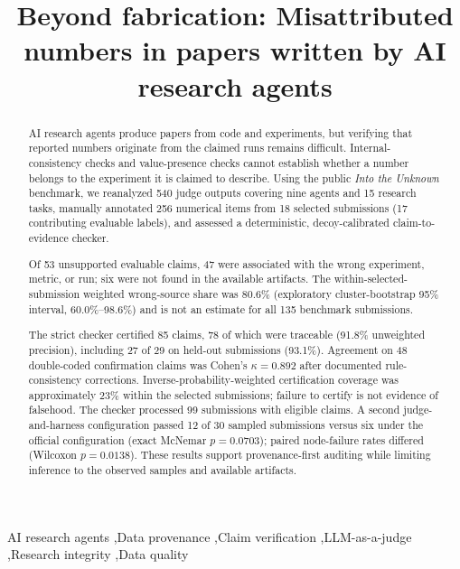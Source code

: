 \documentclass[preprint,12pt,authoryear]{elsarticle}
\newif\ifanon \anontrue
\begin{document}
\begin{frontmatter}
\title{Beyond fabrication: Misattributed numbers in papers written by AI research agents}

\ifanon
\else
\author[aau]{Mosab Alfaqeeh\corref{cor1}}
\ead{m.alfaqeeh@ammanu.edu.jo}
\author[aau]{Omar Mohammed Horani}
\ead{o.horani@ammanu.edu.jo}
\author[aau]{Mou'th Hourani}
\ead{mhourani@ammanu.edu.jo}
\author[bing]{Hashem Alfaqeeh}
\ead{halfageh@binghamton.edu}
\cortext[cor1]{Corresponding author.}
\affiliation[aau]{organization={Al-Ahliyya Amman University},
            city={Amman},
            country={Jordan}}
\affiliation[bing]{organization={Binghamton University, State University of New York},
            city={Binghamton},
            state={NY},
            country={USA}}
\fi

\begin{abstract}
AI research agents produce papers from code and experiments, but verifying that reported numbers originate from the claimed runs remains difficult. Internal-consistency checks and value-presence checks cannot establish whether a number belongs to the experiment it is claimed to describe. Using the public \emph{Into the Unknown} benchmark, we reanalyzed 540 judge outputs covering nine agents and 15 research tasks, manually annotated 256 numerical items from 18 selected submissions (17 contributing evaluable labels), and assessed a deterministic, decoy-calibrated claim-to-evidence checker.

Of 53 unsupported evaluable claims, 47 were associated with the wrong experiment, metric, or run; six were not found in the available artifacts. The within-selected-submission weighted wrong-source share was 80.6\% (exploratory cluster-bootstrap 95\% interval, 60.0\%--98.6\%) and is not an estimate for all 135 benchmark submissions.

The strict checker certified 85 claims, 78 of which were traceable (91.8\% unweighted precision), including 27 of 29 on held-out submissions (93.1\%). Agreement on 48 double-coded confirmation claims was Cohen's $\kappa=0.892$ after documented rule-consistency corrections. Inverse-probability-weighted certification coverage was approximately 23\% within the selected submissions; failure to certify is not evidence of falsehood. The checker processed 99 submissions with eligible claims. A second judge-and-harness configuration passed 12 of 30 sampled submissions versus six under the official configuration (exact McNemar $p=0.0703$); paired node-failure rates differed (Wilcoxon $p=0.0138$). These results support provenance-first auditing while limiting inference to the observed samples and available artifacts.
\end{abstract}

\begin{keyword}
AI research agents \sep Data provenance \sep Claim verification \sep LLM-as-a-judge \sep Research integrity \sep Data quality
\end{keyword}
\end{frontmatter}
\end{document}
